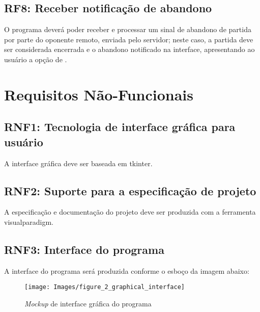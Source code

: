 \subsection{RF8: Receber notificação de abandono} \label{subsection:RF8} 
O programa deverá poder receber e processar um sinal de abandono de partida por parte do oponente remoto, enviada pelo
servidor; neste caso, a partida deve ser considerada encerrada e o abandono notificado na interface, apresentando ao 
usuário a opção de .

\section{Requisitos Não-Funcionais}

\subsection{RNF1: Tecnologia de interface gráfica para usuário} \label{subsection:RNF1}
A interface gráfica deve ser baseada em \gls{tkinter}.

\subsection{RNF2: Suporte para a especificação de projeto} \label{subsection:RNF2}
A especificação e documentação do projeto deve ser produzida com a ferramenta \gls{visualparadigm}.

\subsection{RNF3: Interface do programa} \label{subsection:RNF3}
A interface do programa será produzida conforme o esboço da imagem abaixo:

\begin{figure}[h]
    \centering
    \texttt{[image: Images/figure\_2\_graphical\_interface]}
    \caption{\textit{Mockup} de interface gráfica do programa}
    \label{fig:interface tabuleiro}
\end{figure}

